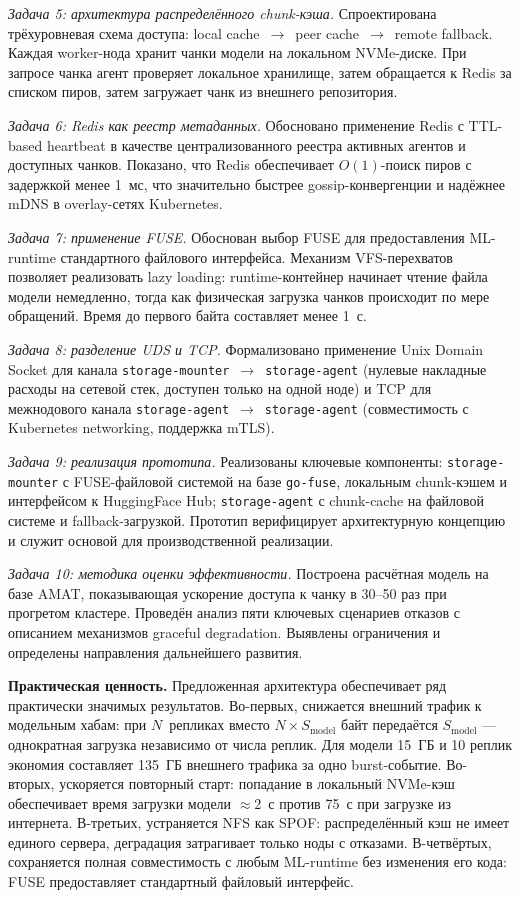 \textit{Задача 5: архитектура распределённого chunk-кэша.} Спроектирована трёхуровневая схема доступа: local cache~$\to$~peer cache~$\to$~remote fallback. Каждая worker-нода хранит чанки модели на локальном NVMe-диске. При запросе чанка агент проверяет локальное хранилище, затем обращается к Redis за списком пиров, затем загружает чанк из внешнего репозитория.

\textit{Задача 6: Redis как реестр метаданных.} Обосновано применение Redis с TTL-based heartbeat в качестве централизованного реестра активных агентов и доступных чанков. Показано, что Redis обеспечивает $O(1)$-поиск пиров с задержкой менее 1~мс, что значительно быстрее gossip-конвергенции и надёжнее mDNS в overlay-сетях Kubernetes.

\textit{Задача 7: применение FUSE.} Обоснован выбор FUSE для предоставления ML-runtime стандартного файлового интерфейса. Механизм VFS-перехватов позволяет реализовать lazy loading: runtime-контейнер начинает чтение файла модели немедленно, тогда как физическая загрузка чанков происходит по мере обращений. Время до первого байта составляет менее 1~с.

\textit{Задача 8: разделение UDS и TCP.} Формализовано применение Unix Domain Socket для канала \texttt{storage-mounter}~$\to$~\texttt{storage-agent} (нулевые накладные расходы на сетевой стек, доступен только на одной ноде) и TCP для межнодового канала \texttt{storage-agent}~$\to$~\texttt{storage-agent} (совместимость с Kubernetes networking, поддержка mTLS).

\textit{Задача 9: реализация прототипа.} Реализованы ключевые компоненты: \texttt{storage-mounter} с FUSE-файловой системой на базе \texttt{go-fuse}, локальным chunk-кэшем и интерфейсом к HuggingFace Hub; \texttt{storage-agent} с chunk-cache на файловой системе и fallback-загрузкой. Прототип верифицирует архитектурную концепцию и служит основой для производственной реализации.

\textit{Задача 10: методика оценки эффективности.} Построена расчётная модель на базе AMAT, показывающая ускорение доступа к чанку в 30--50 раз при прогретом кластере. Проведён анализ пяти ключевых сценариев отказов с описанием механизмов graceful degradation. Выявлены ограничения и определены направления дальнейшего развития.

\textbf{Практическая ценность.} Предложенная архитектура обеспечивает ряд практически значимых результатов. Во-первых, снижается внешний трафик к модельным хабам: при $N$~репликах вместо $N \times S_{\mathrm{model}}$ байт передаётся $S_{\mathrm{model}}$ --- однократная загрузка независимо от числа реплик. Для модели 15~ГБ и 10 реплик экономия составляет 135~ГБ внешнего трафика за одно burst-событие. Во-вторых, ускоряется повторный старт: попадание в локальный NVMe-кэш обеспечивает время загрузки модели $\approx$2~с против 75~с при загрузке из интернета. В-третьих, устраняется NFS как SPOF: распределённый кэш не имеет единого сервера, деградация затрагивает только ноды с отказами. В-четвёртых, сохраняется полная совместимость с любым ML-runtime без изменения его кода: FUSE предоставляет стандартный файловый интерфейс.

